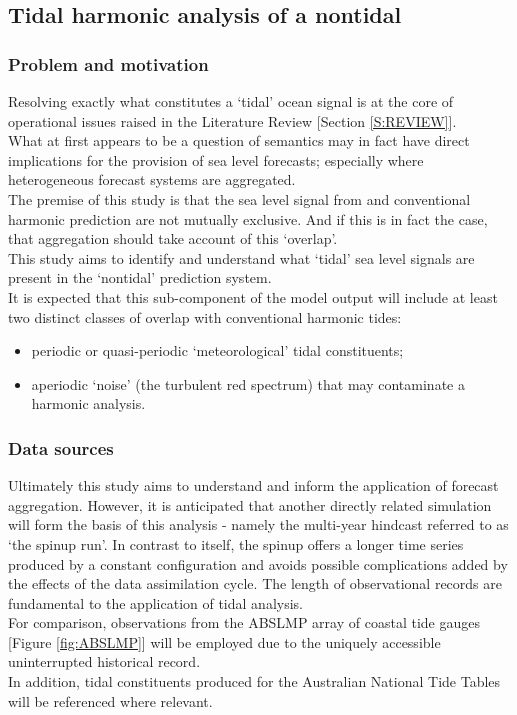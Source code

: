 \newpage
\subsection{Tidal harmonic analysis of a nontidal \OGCM{}}
\label{S:plan_nontidal_tidal}

\subsubsection{Problem and motivation}
Resolving exactly what constitutes a `tidal' ocean signal is at the core of operational issues raised in the Literature Review [Section \ref{S:REVIEW}].\\
What at first appears to be a question of semantics may in fact have direct implications for the provision of sea level forecasts; especially where heterogeneous forecast systems are aggregated.\\
The premise of this study is that the sea level signal from \BL{} and conventional harmonic prediction are not mutually exclusive.  And if this is in fact the case, that aggregation should take account of this `overlap'.\\



This study aims to identify and understand what `tidal' sea level signals are present in the `nontidal' prediction system.\\
It is expected that this sub-component of the model output will include at least two distinct classes of overlap with conventional harmonic tides:
\begin{itemize}
\item periodic or quasi-periodic `meteorological' tidal constituents;
\item aperiodic `noise' (the turbulent red spectrum) that may contaminate a harmonic analysis. 
\end{itemize}


\subsubsection{Data sources}
Ultimately this study aims to understand \BL{} and inform the application of forecast aggregation.   However, it is anticipated that another directly related simulation will form the basis of this analysis - namely the multi-year \OFAM{} hindcast referred to as `the spinup run'.   In contrast to \BL{} itself, the spinup offers a longer time series produced by a constant configuration and avoids possible complications added by the effects of the data assimilation cycle.  The length of observational records are fundamental to the application of tidal analysis.\\
For comparison, observations from the ABSLMP array of coastal tide gauges [Figure \ref{fig:ABSLMP}] will be employed due to the uniquely accessible uninterrupted historical record.\\
In addition, tidal constituents produced for the Australian National Tide Tables will be referenced where relevant.

